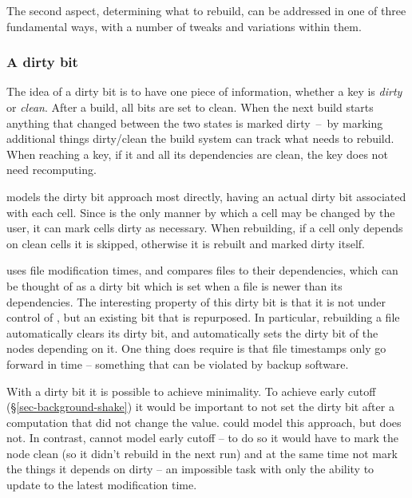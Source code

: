 The second aspect, determining what to rebuild, can be addressed in one of three
fundamental ways, with a number of tweaks and variations within them.

\subsubsection{A dirty bit}\label{sec-dirty-bit}

The idea of a dirty bit is to have one piece of information, whether a key is
\emph{dirty} or \emph{clean}. After a build, all bits are set to clean. When the
next build starts anything that changed between the two states is marked
dirty~--~by marking additional things dirty/clean the build system can track
what needs to rebuild. When reaching a key, if it and all its dependencies are
clean, the key does not need recomputing.

\Excel models the dirty bit approach most directly, having an actual dirty bit
associated with each cell. Since \Excel is the only manner by which a cell may
be changed by the user, it can mark cells dirty as necessary. When rebuilding,
if a cell only depends on clean cells it is skipped, otherwise it is rebuilt and
marked dirty itself.


\Make uses file modification times, and compares files to their dependencies,
which can be thought of as a dirty bit which is set when a file is newer than
its dependencies. The interesting property of this dirty bit is that it is not
under control of \Make, but an existing bit that is repurposed. In particular,
rebuilding a file automatically clears its dirty bit, and automatically sets
the dirty bit of the nodes depending on it. One thing \Make does require is that
file timestamps only go forward in time -- something that can be violated by
backup software.

With a dirty bit it is possible to achieve minimality. To achieve early cutoff
(\S\ref{sec-background-shake}) it would be important to not set the dirty bit
after a computation that did not change the value. \Excel could model this
approach, but does not. In contrast, \Make cannot model early cutoff -- to do so
it would have to mark the node clean (so it didn't rebuild in the next run) and
at the same time not mark the things it depends on dirty -- an impossible task
with only the ability to update to the latest modification time.

